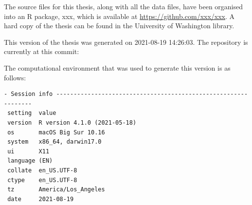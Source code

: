 \documentclass [11pt, proquest] {uwthesis}[2015/03/03]
\begin{document}
The source files for this thesis, along with all the data files, have been organised into an R package, xxx, which is available at \url{https://github.com/xxx/xxx}. A hard copy of the thesis can be found in the University of Washington library.

This version of the thesis was generated on 2021-08-19 14:26:03. The repository is currently at this commit:

The computational environment that was used to generate this version is as follows:
\begin{verbatim}
- Session info ---------------------------------------------------------------
 setting  value                       
 version  R version 4.1.0 (2021-05-18)
 os       macOS Big Sur 10.16         
 system   x86_64, darwin17.0          
 ui       X11                         
 language (EN)                        
 collate  en_US.UTF-8                 
 ctype    en_US.UTF-8                 
 tz       America/Los_Angeles         
 date     2021-08-19                  


\end{verbatim}
\end{document}

